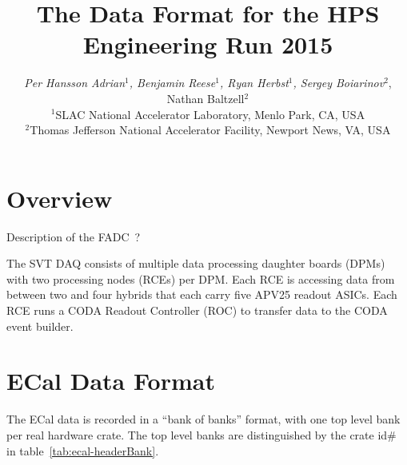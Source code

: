 \documentclass{desyproc}
\begin{document}
\title{The Data Format for the HPS Engineering Run 2015 }

\author{{\slshape Per Hansson Adrian$^1$, Benjamin Reese$^1$, Ryan Herbst$^1$, Sergey Boiarinov$^2$}, Nathan Baltzell$^2$\\
$^1$SLAC National Accelerator Laboratory, Menlo Park, CA, USA\\
$^2$Thomas Jefferson National Accelerator Facility, Newport News, VA, USA}



\maketitle







\section{Overview}

Description of the FADC~\cite{fadc250}?


The SVT DAQ consists of multiple data processing daughter boards (DPMs) with two processing nodes (RCEs) per DPM. 
Each RCE is accessing data from between two and four hybrids that each carry five APV25 readout ASICs. Each RCE 
runs a CODA Readout Controller  (ROC) to transfer data to the CODA event builder. 

\section{ECal Data Format}
The ECal data is recorded in a ``bank of banks'' format, with one top level bank per real hardware crate.  The top level banks are distinguished by the crate id\# in table~\ref{tab:ecal-headerBank}.
\end{document}
